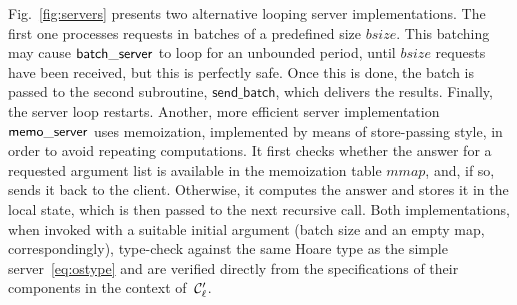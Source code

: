 Fig.~\ref{fig:servers} presents two alternative looping server
implementations.
%
The first one processes requests in batches of a predefined size
$\mathit{bsize}$.
%
This batching may cause $\mathsf{batch\_server}$ to loop for an unbounded period, until
$\mathit{bsize}$ requests have been received, but this is perfectly
safe.
%
%
Once this is done, the batch is passed to the second subroutine,
$\mathsf{send\_batch}$, which delivers the results. Finally, the
server loop restarts.
%
Another, more efficient server implementation $\mathsf{memo\_server}$ uses memoization, implemented by means
of store-passing style, in order to avoid repeating computations. It
first checks whether the answer for a requested argument list is
available in the memoization table $\mathit{mmap}$, and, if so, sends
it back to the client. Otherwise, it computes the answer and stores it
in the local state, which is then passed to the next recursive call.
%
Both implementations, when invoked with a suitable initial argument
(batch size and an empty map, correspondingly), type-check against the
same Hoare type as the simple server~\eqref{eq:ostype} and are
verified directly from the specifications of their components in the
context of~$\mathcal{C}'_{\ell}$.


\begin{wrapfigure}[5]{h}{0.4\textwidth}
\vspace{-12pt}
\end{wrapfigure}
%
